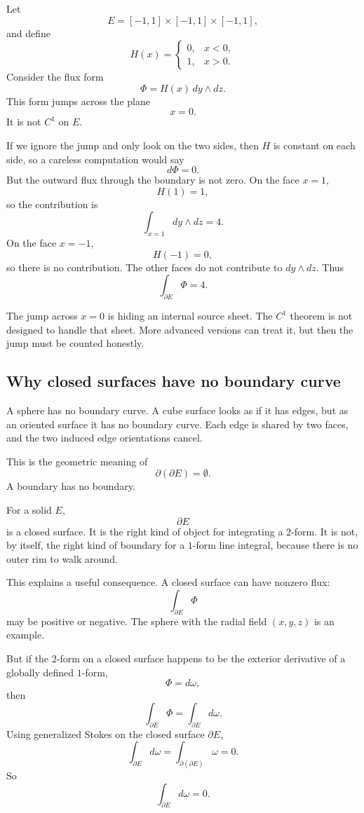Let
\[
    E=[-1,1]\times[-1,1]\times[-1,1],
\]
and define
\[
    H(x)=
    \begin{cases}
    0, & x<0,\\
    1, & x>0.
    \end{cases}
\]
Consider the flux form
\[
    \Phi=H(x)\,dy\wedge dz.
\]
This form jumps across the plane
\[
    x=0.
\]
It is not \(C^1\) on \(E\).

If we ignore the jump and only look on the two sides, then \(H\) is constant on each
side, so a careless computation would say
\[
    d\Phi=0.
\]
But the outward flux through the boundary is not zero.  On the face \(x=1\),
\[
    H(1)=1,
\]
so the contribution is
\[
    \int_{x=1}dy\wedge dz=4.
\]
On the face \(x=-1\),
\[
    H(-1)=0,
\]
so there is no contribution.  The other faces do not contribute to \(dy\wedge dz\).
Thus
\[
\boxed{
    \int_{\partial E}\Phi=4.
}
\]

The jump across \(x=0\) is hiding an internal source sheet.  The \(C^1\) theorem is not
designed to handle that sheet.  More advanced versions can treat it, but then the jump
must be counted honestly.

\subsection{Why closed surfaces have no boundary curve}

A sphere has no boundary curve.  A cube surface looks as if it has edges, but as an
oriented surface it has no boundary curve.  Each edge is shared by two faces, and the
two induced edge orientations cancel.

This is the geometric meaning of
\[
\boxed{
    \partial(\partial E)=\emptyset.
}
\]
A boundary has no boundary.

For a solid \(E\),
\[
    \partial E
\]
is a closed surface.  It is the right kind of object for integrating a \(2\)-form.  It is not,
by itself, the right kind of boundary for a \(1\)-form line integral, because there is no
outer rim to walk around.

This explains a useful consequence.  A closed surface can have nonzero flux:
\[
    \int_{\partial E}\Phi
\]
may be positive or negative.  The sphere with the radial field \((x,y,z)\) is an example.

But if the \(2\)-form on a closed surface happens to be the exterior derivative of a
globally defined \(1\)-form,
\[
    \Phi=d\omega,
\]
then
\[
    \int_{\partial E}\Phi
    =
    \int_{\partial E}d\omega.
\]
Using generalized Stokes on the closed surface \(\partial E\),
\[
    \int_{\partial E}d\omega
    =
    \int_{\partial(\partial E)}\omega
    =
    0.
\]
So
\[
\boxed{
    \int_{\partial E}d\omega=0.
}
\]

